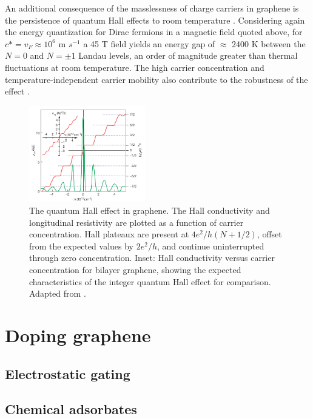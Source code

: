 \documentclass[edeposit,fullpage,draftthesis]{uiucthesis2009}
\begin{document}
    An additional consequence of the masslessness of charge carriers in graphene is the persistence of quantum Hall effects to room temperature \cite{Novoselov2007}. Considering again the energy quantization for Dirac fermions in a magnetic field quoted above, for $c\ast = v_F \approx 10^6$ m $s^{-1}$ a 45 T field yields an energy gap of $\approx$ 2400 K between the $N=0$ and $N=\pm1$ Landau levels, an order of magnitude greater than thermal fluctuations at room temperature. The high carrier concentration and temperature-independent carrier mobility also contribute to the robustness of the effect \cite{Novoselov2007}.

    \begin{figure}
    \centering
    \includegraphics[width=0.45\textwidth]{images/background/QHEinG.png}
    \caption[The quantum Hall effect in graphene]{The quantum Hall effect in graphene. The Hall conductivity and longitudinal resistivity are plotted as a function of carrier concentration. Hall plateaux are present at $4 e^2 / h (N + 1/2)$, offset from the expected values by $2 e^2 / h$, and continue uninterrupted through zero concentration. Inset: Hall conductivity versus carrier concentration for bilayer graphene, showing the expected characteristics of the integer quantum Hall effect for comparison. Adapted from \cite{Novoselov2005}.}
    \label{fig:QHEinG}
    \end{figure}

        
    \section{Doping graphene}
    
        \subsection{Electrostatic gating}
        
        \subsection{Chemical adsorbates}
    
\end{document}
